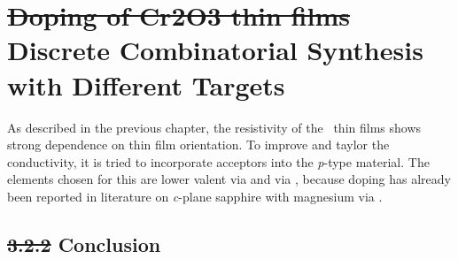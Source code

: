 \section{\sout{Doping of Cr2O3 thin films} Discrete Combinatorial Synthesis with Different Targets}
    \label{Sec:Results_Doping}
As described in the previous chapter, the resistivity of the \cro\ thin films shows strong dependence on thin film orientation.
To improve and taylor the conductivity, it is tried to incorporate acceptors into the \textit{p}-type material.
The elements chosen for this are lower valent  via  and  via , because doping has already been reported in literature on \textit{c}-plane sapphire with magnesium via 
    \cite{farrell2015}.

        
\subsection*{\sout{3.2.2} Conclusion}
    